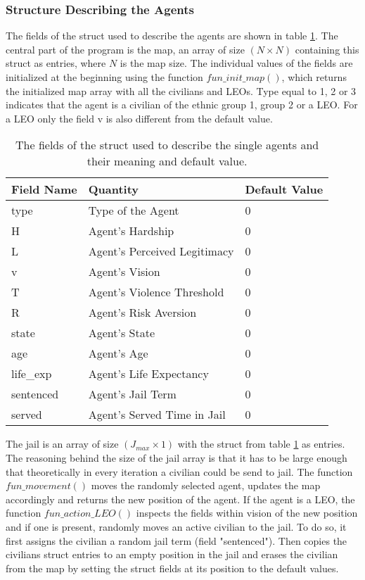 \documentclass[11pt]{article}
\begin{document}
\subsubsection{Structure Describing the Agents}
The fields of the struct used to describe the agents are shown in table \ref{tab:fields_struct}. The central part of the program is the map, an array of size $(N \times N)$ containing this struct as entries, where $N$ is the map size. The individual values of the fields are initialized at the beginning using the function $fun\_init\_map()$, which returns the initialized map array with all the civilians and LEOs. Type equal to 1, 2 or 3 indicates that the agent is a civilian of the ethnic group 1, group 2 or a LEO. For a LEO only the field v is also different from the default value.
\begin{table}[!htbp]
	\centering
	\caption{The fields of the struct used to describe the single agents and their meaning and default value.}
	\vspace{0.5 cm}
		\begin{tabular}{l | l | l} 
			Field Name & Quantity & Default Value\\
			\hline
			type & Type of the Agent & 0\\
			H & Agent's Hardship & 0\\
			L & Agent's Perceived Legitimacy & 0\\
			v & Agent's Vision & 0\\
			T & Agent's Violence Threshold & 0\\
			R & Agent's Risk Aversion & 0\\
			state & Agent's State & 0\\
			age & Agent's Age & 0\\
			life\_exp & Agent's Life Expectancy & 0\\
			sentenced & Agent's Jail Term & 0\\
			served & Agent's Served Time in Jail & 0
	\end{tabular}
	\label{tab:fields_struct}
\end{table}
The jail is an array of size $(J_{max} \times 1)$ with the struct from table \ref{tab:fields_struct} as entries. The reasoning behind the size of the jail array is that it has to be large enough that theoretically in every iteration a civilian could be send to jail. The function $fun\_movement()$ moves the randomly selected agent, updates the map accordingly and returns the new position of the agent. If the agent is a LEO, the function $fun\_action\_LEO()$ inspects the fields within vision of the new position and if one is present, randomly moves an active civilian to the jail. To do so, it first assigns the civilian a random jail term (field "sentenced"). Then copies the civilians struct entries to an empty position in the jail and erases the civilian from the map by setting the struct fields at its position to the default values.\\
\end{document}
